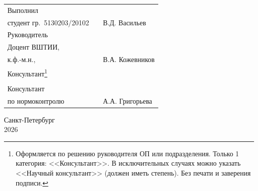 \vspace{4mm plus2fill}%

\noindent
\begin{tabularx}{\linewidth}{lXl}
	Выполнил              &	   &             \\
	студент гр.~5130203/20102     &    & В.Д. Васильев     \\[\mfloatsep]

	Руководитель 		  &    &             \\
	Доцент ВШТИИ,		  &    &             \\
	к.ф.-м.н., 	  &    & В.А. Кожевников \\[\mfloatsep]
	
	Консультант\footnote{Оформляется по решению руководителя ОП или подразделения. Только 1 категория: <<Консультант>>. В исключительных случаях можно указать <<Научный консультант>> (должен иметь степень). Без печати и заверения подписи.}		  &    & 			 \\
	\ConsultantExtraDegree 	  &    & \ConsultantExtra\\[\mfloatsep]
	
	Консультант  &    &  \\   	
	по нормоконтролю  		 	  &    & А.А. Григорьева %
\end{tabularx} %


%
\vspace{0pt plus4fill}%


\begin{center}%
Санкт-Петербург \\
2026
\end{center}%
\restoregeometry
\newpage